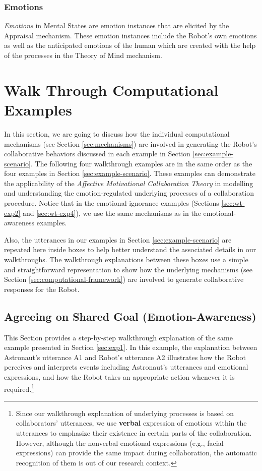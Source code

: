 \subsubsection{Emotions}

\textit{Emotions} in Mental States are emotion instances that are elicited by
the Appraisal mechanism. These emotion instances include the Robot's own
emotions as well as the anticipated emotions of the human which are created with
the help of the processes in the Theory of Mind mechanism.

\section{Walk Through Computational Examples}
\label{sec:wtce}

In this section, we are going to discuss how the individual computational
mechanisms (see Section \ref{sec:mechanisms}) are involved in generating the
Robot's collaborative behaviors discussed in each example in Section
\ref{sec:example-scenario}. The following four walkthrough examples are in the
same order as the four examples in Section \ref{sec:example-scenario}. These
examples can demonstrate the applicability of the \textit{Affective Motivational
Collaboration Theory} in modelling and understanding the emotion-regulated
underlying processes of a collaboration procedure. Notice that in the
emotional-ignorance examples (Sections \ref{sec:wt-exp2} and \ref{sec:wt-exp4}),
we use the same mechanisms as in the emotional-awareness examples.

Also, the utterances in our examples in Section \ref{sec:example-scenario} are
repeated here inside boxes to help better understand the associated details in
our walkthroughs. The walkthrough explanations between these boxes use a simple
and straightforward representation to show how the underlying mechanisms (see
Section \ref{sec:computational-framework}) are involved to generate
collaborative responses for the Robot.

\subsection{Agreeing on Shared Goal (Emotion-Awareness)}
\label{sec:wt-exp1}

This Section provides a step-by-step walkthrough explanation of the same
example presented in Section \ref{sec:exp1}. In this example, the explanation
between Astronaut's utterance A1 and Robot's utterance A2 illustrates how the
Robot perceives and interprets events including Astronaut's utterances and
emotional expressions, and how the Robot takes an appropriate action whenever it
is required.\footnote{Since our walkthrough explanation of underlying processes
is based on collaborators' utterances, we use \textbf{verbal} expression of
emotions within the utterances to emphasize their existence in certain parts of
the collaboration. However, although the nonverbal emotional expressions (e.g.,
facial expressions) can provide the same impact during collaboration, the
automatic recognition of them is out of our research context.}\\

